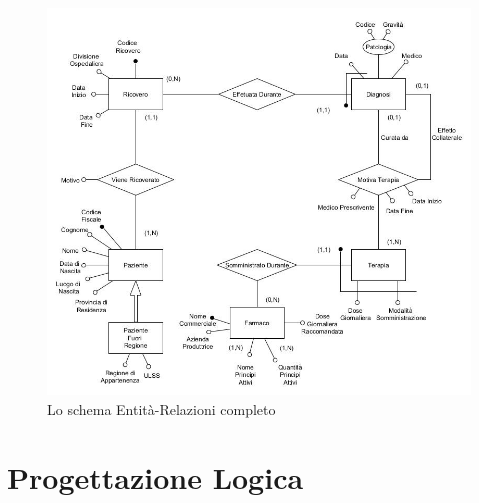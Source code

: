\documentclass{article}
\begin{document}
\begin{figure} %
    \centering
    \includegraphics[width=\linewidth]{schema1}
    \caption{Lo schema Entità-Relazioni completo}
    \label{schema_ER_progettazione_modello}
  \end{figure}






\clearpage
\section{Progettazione Logica}
\end{document}
